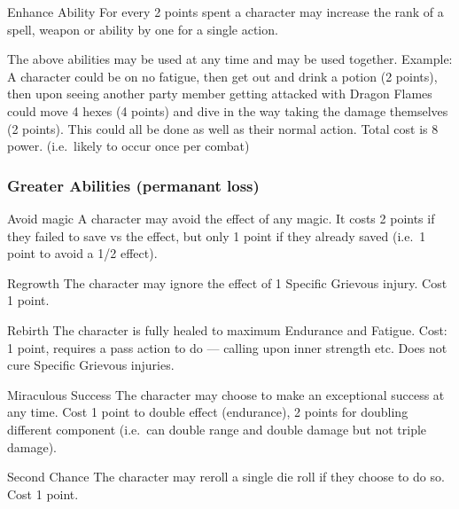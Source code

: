 \documentclass[a4paper]{article}
\begin{document}
\begin{multicols}{2}
\begin{Description}
\item[Enhance Ability] For every 2 points spent a character may
increase the rank of a spell, weapon or ability by one for a single
action.

\end{Description}

The above abilities may be used at any time and may be used
together. Example: A character could be on no fatigue, then get out
and drink a potion (2 points), then upon seeing another party member
getting attacked with Dragon Flames could move 4 hexes (4 points) and
dive in the way taking the damage themselves (2 points).  This could
all be done as well as their normal action.  Total cost is 8
power. (i.e.\ likely to occur once per combat)


\subsubsection{Greater Abilities (permanant loss)}

\begin{Description}

\item[Avoid magic] A character may avoid the effect of any magic.  It
costs 2 points if they failed to save vs the effect, but only 1 point
if they already saved (i.e.\ 1 point to avoid a 1/2 effect).

\item[Regrowth] The character may ignore the effect of 1 Specific
Grievous injury.  Cost 1 point.

\item[Rebirth] The character is fully healed to maximum Endurance and
Fatigue.  Cost: 1 point, requires a pass action to do --- calling upon
inner strength etc.  Does not cure Specific Grievous injuries.

\item[Miraculous Success] The character may choose to make an
exceptional success at any time.  Cost 1 point to double effect
(endurance), 2 points for doubling different component (i.e.\ can
double range and double damage but not triple damage).

\item[Second Chance]  The character may reroll a single die roll if they
choose to do so.  Cost 1 point.

\end{Description}

\raggedcolumns
\newpage
\end{multicols}
\end{document}

